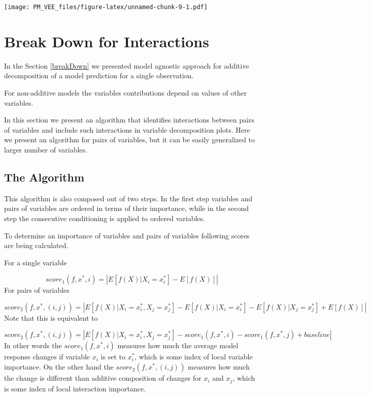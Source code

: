 \documentclass[]{book}
\theoremstyle{definition}
\theoremstyle{definition}
\theoremstyle{definition}
\theoremstyle{remark}
\begin{document}
\texttt{[image: PM\_VEE\_files/figure-latex/unnamed-chunk-9-1.pdf]}

\hypertarget{break-down-for-interactions}{%
\chapter{Break Down for
Interactions}\label{break-down-for-interactions}}

In the Section \ref{breakDown} we presented model agnostic approach for
additive decomposition of a model prediction for a single observation.

For non-additive models the variables contributions depend on values of
other variables.

In this section we present an algorithm that identifies interactions
between pairs of variables and include such interactions in variable
decomposition plots. Here we present an algorithm for pairs of
variables, but it can be easily generalized to larger number of
variables.

\hypertarget{the-algorithm-1}{%
\section{The Algorithm}\label{the-algorithm-1}}

This algorithm is also composed out of two steps. In the first step
variables and pairs of variables are ordered in terms of their
importance, while in the second step the consecutive conditioning is
applied to ordered variables.

To determine an importance of variables and pairs of variables following
scores are being calculated.

For a single variable

\[
score_1(f, x^*, i) = \left| E [f(X)|X_i = x^*_i]  - E [f(X)]\right|
\] For pairs of variables

\[
score_2(f, x^*, (i,j)) = \left| E [f(X)|X_i = x^*_i, X_j = x^*_j] - E [f(X)|X_i = x^*_i] - E [f(X)| X_j = x^*_j]+ E [f(X)] \right|
\] Note that this is equivalent to

\[
score_2(f, x^*, (i,j)) = \left| E [f(X)|X_i = x^*_i, X_j = x^*_j] - score_1 (f, x^*, i) - score_1 (f, x^*, j) + baseline \right|
\] In other words the \(score_1(f, x^*, i)\) measures how much the
average model response changes if variable \(x_i\) is set to \(x_i^*\),
which is some index of local variable importance. On the other hand the
\(score_2(f, x^*, (i,j))\) measures how much the change is different
than additive composition of changes for \(x_i\) and \(x_j\), which is
some index of local interaction importance.
\end{document}
